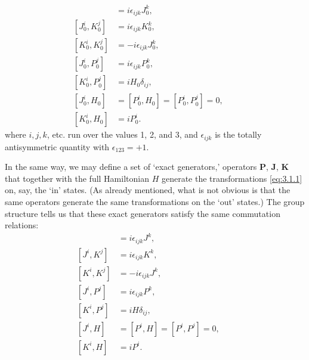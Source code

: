 \begin{align}
[J_0^i,J_0^j]&=i\epsilon_{ijk}J_0^k, &&\tag{3.3.4}\label{eq:3.3.4}\\
[J_0^i,K_0^j]&=i\epsilon_{ijk}K_0^k, &&\tag{3.3.5}\label{eq:3.3.5}\\
[K_0^i,K_0^j]&=-i\epsilon_{ijk}J_0^k, &&\tag{3.3.6}\label{eq:3.3.6}\\
[J_0^i,P_0^j]&=i\epsilon_{ijk}P_0^k, &&\tag{3.3.7}\label{eq:3.3.7}\\
[K_0^i,P_0^j]&=iH_0\delta_{ij}, &&\tag{3.3.8}\label{eq:3.3.8}\\
[J_0^i,H_0]&=[P_0^i,H_0]=[P_0^i,P_0^j]=0, &&\tag{3.3.9}\label{eq:3.3.9}\\
[K_0^i,H_0]&=iP_0^i. &&\tag{3.3.10}\label{eq:3.3.10}
\end{align}
where $i,j,k$, etc. run over the values 1, 2, and 3, and $\epsilon_{ijk}$ is the
totally antisymmetric quantity with $\epsilon_{123}=+1$.

In the same way, we may define a set of `exact generators,' operators
$\mathbf{P}$, $\mathbf{J}$, $\mathbf{K}$ that together with the full Hamiltonian
$H$ generate the transformations \eqref{eq:3.1.1} on, say, the `in' states. (As already
mentioned, what is not obvious is that the same operators generate the same
transformations on the `out' states.) The group structure tells us that these
exact generators satisfy the same commutation relations:
\begin{align}
[J^i,J^j]&=i\epsilon_{ijk}J^k, &&\tag{3.3.11}\label{eq:3.3.11}\\
[J^i,K^j]&=i\epsilon_{ijk}K^k, &&\tag{3.3.12}\label{eq:3.3.12}\\
[K^i,K^j]&=-i\epsilon_{ijk}J^k, &&\tag{3.3.13}\label{eq:3.3.13}\\
[J^i,P^j]&=i\epsilon_{ijk}P^k, &&\tag{3.3.14}\label{eq:3.3.14}\\
[K^i,P^j]&=iH\delta_{ij}, &&\tag{3.3.15}\label{eq:3.3.15}\\
[J^i,H]&=[P^i,H]=[P^i,P^j]=0, &&\tag{3.3.16}\label{eq:3.3.16}\\
[K^i,H]&=iP^i. &&\tag{3.3.17}\label{eq:3.3.17}
\end{align}

